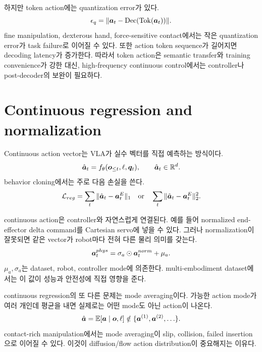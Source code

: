 하지만 token action에는 quantization error가 있다.
\begin{equation}
  \epsilon_{q}
  =
  \|\bm{a}_t - \mathrm{Dec}(\mathrm{Tok}(\bm{a}_t))\|.
  \label{eq:ch13-quantization-error}
\end{equation}
fine manipulation, dexterous hand, force-sensitive contact에서는 작은 quantization error가 task failure로 이어질 수 있다. 또한 action token sequence가 길어지면 decoding latency가 증가한다. 따라서 token action은 semantic transfer와 training convenience가 강한 대신, high-frequency continuous control에서는 controller나 post-decoder의 보완이 필요하다.

\section{Continuous regression and normalization}

Continuous action vector는 VLA가 실수 벡터를 직접 예측하는 방식이다.
\begin{equation}
  \hat{\bm{a}}_t
  =
  f_{\theta}(\bm{o}_{\leq t},\ell,\bm{q}_t),
  \qquad
  \hat{\bm{a}}_t\in\mathbb{R}^{d}.
  \label{eq:ch13-continuous-regression}
\end{equation}
behavior cloning에서는 주로 다음 손실을 쓴다.
\begin{equation}
  \mathcal{L}_{reg}
  =
  \sum_t
  \|\hat{\bm{a}}_t - \bm{a}_t^{E}\|_1
  \quad
  \mathrm{or}
  \quad
  \sum_t
  \|\hat{\bm{a}}_t - \bm{a}_t^{E}\|_2^2.
  \label{eq:ch13-regression-loss}
\end{equation}

continuous action은 controller와 자연스럽게 연결된다. 예를 들어 normalized end-effector delta command를 Cartesian servo에 넣을 수 있다. 그러나 normalization이 잘못되면 같은 vector가 robot마다 전혀 다른 물리 의미를 갖는다.
\begin{equation}
  \bm{a}_t^{phys}
  =
  \sigma_a \odot \bm{a}_t^{norm}
  +
  \mu_a.
  \label{eq:ch13-action-denormalization}
\end{equation}
$\mu_a,\sigma_a$는 dataset, robot, controller mode에 의존한다. multi-embodiment dataset에서는 이 값이 성능과 안전성에 직접 영향을 준다.

continuous regression의 또 다른 문제는 mode averaging이다. 가능한 action mode가 여러 개인데 평균을 내면 실제로는 어떤 mode도 아닌 action이 나온다.
\begin{equation}
  \hat{\bm{a}}
  =
  \mathbb{E}[\bm{a}\mid\bm{o},\ell]
  \notin
  \{\bm{a}^{(1)},\bm{a}^{(2)},\ldots\}.
  \label{eq:ch13-mode-averaging}
\end{equation}
contact-rich manipulation에서는 mode averaging이 slip, collision, failed insertion으로 이어질 수 있다. 이것이 diffusion/flow action distribution이 중요해지는 이유다.

